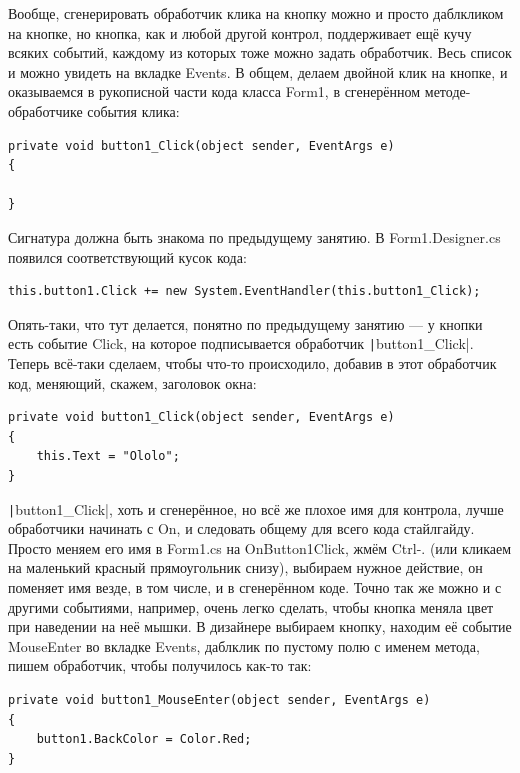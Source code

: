 \documentclass[a5paper]{article}
\begin{document}
Вообще, сгенерировать обработчик клика на кнопку можно и просто даблкликом на кнопке, но кнопка, как и любой другой контрол, поддерживает ещё кучу всяких событий, каждому из которых тоже можно задать обработчик. Весь список и можно увидеть на вкладке Events. В общем, делаем двойной клик на кнопке, и оказываемся в рукописной части кода класса Form1, в сгенерённом методе-обработчике события клика:

\begin{verbatim}
private void button1_Click(object sender, EventArgs e)
{

}
\end{verbatim}

Сигнатура должна быть знакома по предыдущему занятию. В Form1.Designer.cs появился соответствующий кусок кода:

\begin{verbatim}
this.button1.Click += new System.EventHandler(this.button1_Click);
\end{verbatim}

Опять-таки, что тут делается, понятно по предыдущему занятию --- у кнопки есть событие Click, на которое подписывается обработчик \texttt|button1_Click|. Теперь всё-таки сделаем, чтобы что-то происходило, добавив в этот обработчик код, меняющий, скажем, заголовок окна:

\begin{verbatim}
private void button1_Click(object sender, EventArgs e)
{
    this.Text = "Ololo";
}
\end{verbatim}

\texttt|button1_Click|, хоть и сгенерённое, но всё же плохое имя для контрола, лучше обработчики начинать с On, и следовать общему для всего кода стайлгайду. Просто меняем его имя в Form1.cs на OnButton1Click, жмём Ctrl-. (или кликаем на маленький красный прямоугольник снизу), выбираем нужное действие, он поменяет имя везде, в том числе, и в сгенерённом коде. Точно так же можно и с другими событиями, например, очень легко сделать, чтобы кнопка меняла цвет при наведении на неё мышки. В дизайнере выбираем кнопку, находим её событие MouseEnter во вкладке Events, даблклик по пустому полю с именем метода, пишем обработчик, чтобы получилось как-то так:

\begin{verbatim}
private void button1_MouseEnter(object sender, EventArgs e)
{
    button1.BackColor = Color.Red;
}
\end{verbatim}
\end{document}
